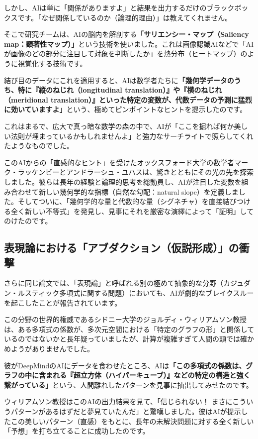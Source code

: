 しかし、AIは単に「関係がありますよ」と結果を出力するだけのブラックボックスです。「なぜ関係しているのか（論理的理由）」は教えてくれません。

そこで研究チームは、AIの脳内を解剖する\textbf{「サリエンシー・マップ（Saliency map：顕著性マップ）」}という技術を使いました。これは画像認識AIなどで「AIが画像のどの部分に注目して対象を判断したか」を熱分布（ヒートマップ）のように視覚化する技術です。

結び目のデータにこれを適用すると、AIは数学者たちに\textbf{「幾何学データのうち、特に『縦のねじれ（longitudinal translation）』や『横のねじれ（meridional translation）』といった特定の変数が、代数データの予測に猛烈に効いていますよ」}という、極めてピンポイントなヒントを提示したのです。

これはまるで、広大で真っ暗な数学の森の中で、AIが「ここを掘れば何か美しい法則が埋まっているかもしれませんよ」と強力なサーチライトで照らしてくれたようなものでした。

このAIからの「直感的なヒント」を受けたオックスフォード大学の数学者マーク・ラッケンビーとアンドラーシュ・ユハスは、驚きとともにその光の先を探索しました。彼らは長年の経験と論理的思考を総動員し、AIが注目した変数を組み合わせて新しい幾何学的な指標（自然な勾配：natural slope）を定義しました。そしてついに、「幾何学的な量と代数的な量（シグネチャ）を直接結びつける全く新しい不等式」を発見し、見事にそれを厳密な演繹によって「証明」してのけたのです。

\subsection{表現論における「アブダクション（仮説形成）」の衝撃}

さらに同じ論文では、「表現論」と呼ばれる別の極めて抽象的な分野（カジュダン・ルスティック多項式に関する問題）においても、AIが劇的なブレイクスルーを起こしたことが報告されています。

この分野の世界的権威であるシドニー大学のジョルディ・ウィリアムソン教授は、ある多項式の係数が、多次元空間における「特定のグラフの形」と関係しているのではないかと長年疑っていましたが、計算が複雑すぎて人間の頭では確かめようがありませんでした。

彼がDeepMindのAIにデータを食わせたところ、AIは\textbf{「この多項式の係数は、グラフの中に含まれる『超立方体（ハイパーキューブ）』などの特定の構造と強く繋がっている」}という、人間離れしたパターンを見事に抽出してみせたのです。

ウィリアムソン教授はこのAIの出力結果を見て、「信じられない！ まさにこういうパターンがあるはずだと夢見ていたんだ」と驚嘆しました。彼はAIが提示したこの美しいパターン（直感）をもとに、長年の未解決問題に対する全く新しい「予想」を打ち立てることに成功したのです。


